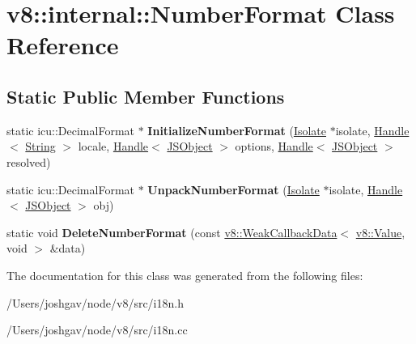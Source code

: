 \hypertarget{classv8_1_1internal_1_1_number_format}{}\section{v8\+:\+:internal\+:\+:Number\+Format Class Reference}
\label{classv8_1_1internal_1_1_number_format}
\subsection*{Static Public Member Functions}
\begin{DoxyCompactItemize}
\item 
static icu\+::\+Decimal\+Format $\ast$ {\bfseries Initialize\+Number\+Format} (\hyperlink{classv8_1_1internal_1_1_isolate}{Isolate} $\ast$isolate, \hyperlink{classv8_1_1internal_1_1_handle}{Handle}$<$ \hyperlink{classv8_1_1internal_1_1_string}{String} $>$ locale, \hyperlink{classv8_1_1internal_1_1_handle}{Handle}$<$ \hyperlink{classv8_1_1internal_1_1_j_s_object}{J\+S\+Object} $>$ options, \hyperlink{classv8_1_1internal_1_1_handle}{Handle}$<$ \hyperlink{classv8_1_1internal_1_1_j_s_object}{J\+S\+Object} $>$ resolved)\hypertarget{classv8_1_1internal_1_1_number_format_a20e3fcf9dafa7af6360eef210a0368cd}{}\label{classv8_1_1internal_1_1_number_format_a20e3fcf9dafa7af6360eef210a0368cd}

\item 
static icu\+::\+Decimal\+Format $\ast$ {\bfseries Unpack\+Number\+Format} (\hyperlink{classv8_1_1internal_1_1_isolate}{Isolate} $\ast$isolate, \hyperlink{classv8_1_1internal_1_1_handle}{Handle}$<$ \hyperlink{classv8_1_1internal_1_1_j_s_object}{J\+S\+Object} $>$ obj)\hypertarget{classv8_1_1internal_1_1_number_format_a2ee56e42efcf08f61503f156f10218f0}{}\label{classv8_1_1internal_1_1_number_format_a2ee56e42efcf08f61503f156f10218f0}

\item 
static void {\bfseries Delete\+Number\+Format} (const \hyperlink{classv8_1_1_weak_callback_data}{v8\+::\+Weak\+Callback\+Data}$<$ \hyperlink{classv8_1_1_value}{v8\+::\+Value}, void $>$ \&data)\hypertarget{classv8_1_1internal_1_1_number_format_a8de7f5b69b234734ece94d2a04a780c7}{}\label{classv8_1_1internal_1_1_number_format_a8de7f5b69b234734ece94d2a04a780c7}

\end{DoxyCompactItemize}


The documentation for this class was generated from the following files\+:\begin{DoxyCompactItemize}
\item 
/\+Users/joshgav/node/v8/src/i18n.\+h\item 
/\+Users/joshgav/node/v8/src/i18n.\+cc\end{DoxyCompactItemize}
